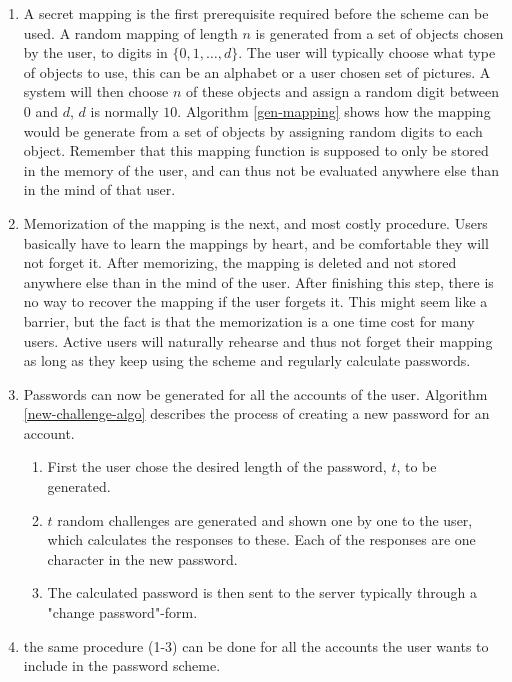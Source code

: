 \begin{enumerate}
    \item A secret mapping is the first prerequisite required before the scheme can be used. A random mapping of length $n$ is generated from a set of objects chosen by the user, to digits in $\{0,1,\dots,d\}$. The user will typically choose what type of objects to use, this can be an alphabet or a user chosen set of pictures. A system will then choose $n$ of these objects and assign a random digit between $0$ and $d$, $d$ is normally $10$. Algorithm \ref{gen-mapping} shows how the mapping would be generate from a set of objects by assigning random digits to each object. Remember that this mapping function is supposed to only be stored in the memory of the user, and can thus not be evaluated anywhere else than in the mind of that user.
    \item Memorization of the mapping is the next, and most costly procedure. Users basically have to learn the mappings by heart, and be comfortable they will not forget it. After memorizing, the mapping is deleted and not stored anywhere else than in the mind of the user. After finishing this step, there is no way to recover the mapping if the user forgets it. This might seem like a barrier, but the fact is that the memorization is a one time cost for many users. Active users will naturally rehearse and thus not forget their mapping as long as they keep using the scheme and regularly calculate passwords.
    \item Passwords can now be generated for all the accounts of the user. Algorithm \ref{new-challenge-algo} describes the process of creating a new password for an account. 
    \begin{enumerate}
        \item First the user chose the desired length of the password, $t$, to be generated. 
        \item $t$ random challenges are generated and shown one by one to the user, which calculates the responses to these. Each of the responses are one character in the new password. 
        \item The calculated password is then sent to the server typically through a "change password"-form. 
    \end{enumerate}
    \item the same procedure (1-3) can be done for all the accounts the user wants to include in the password scheme.
\end{enumerate}

